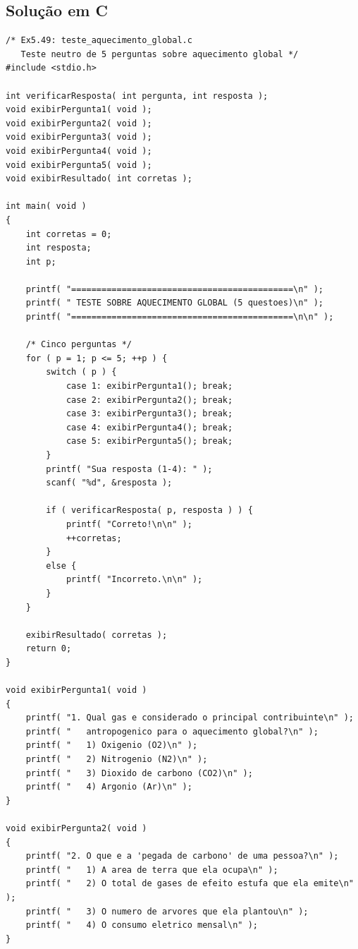 \documentclass[12pt,a4paper]{article}
\begin{document}
\subsection*{Solução em C}

\begin{respostabox}
\begin{lstlisting}
/* Ex5.49: teste_aquecimento_global.c
   Teste neutro de 5 perguntas sobre aquecimento global */
#include <stdio.h>

int verificarResposta( int pergunta, int resposta );
void exibirPergunta1( void );
void exibirPergunta2( void );
void exibirPergunta3( void );
void exibirPergunta4( void );
void exibirPergunta5( void );
void exibirResultado( int corretas );

int main( void )
{
    int corretas = 0;
    int resposta;
    int p;

    printf( "============================================\n" );
    printf( " TESTE SOBRE AQUECIMENTO GLOBAL (5 questoes)\n" );
    printf( "============================================\n\n" );

    /* Cinco perguntas */
    for ( p = 1; p <= 5; ++p ) {
        switch ( p ) {
            case 1: exibirPergunta1(); break;
            case 2: exibirPergunta2(); break;
            case 3: exibirPergunta3(); break;
            case 4: exibirPergunta4(); break;
            case 5: exibirPergunta5(); break;
        }
        printf( "Sua resposta (1-4): " );
        scanf( "%d", &resposta );

        if ( verificarResposta( p, resposta ) ) {
            printf( "Correto!\n\n" );
            ++corretas;
        }
        else {
            printf( "Incorreto.\n\n" );
        }
    }

    exibirResultado( corretas );
    return 0;
}

void exibirPergunta1( void )
{
    printf( "1. Qual gas e considerado o principal contribuinte\n" );
    printf( "   antropogenico para o aquecimento global?\n" );
    printf( "   1) Oxigenio (O2)\n" );
    printf( "   2) Nitrogenio (N2)\n" );
    printf( "   3) Dioxido de carbono (CO2)\n" );
    printf( "   4) Argonio (Ar)\n" );
}

void exibirPergunta2( void )
{
    printf( "2. O que e a 'pegada de carbono' de uma pessoa?\n" );
    printf( "   1) A area de terra que ela ocupa\n" );
    printf( "   2) O total de gases de efeito estufa que ela emite\n" );
    printf( "   3) O numero de arvores que ela plantou\n" );
    printf( "   4) O consumo eletrico mensal\n" );
}


\end{lstlisting}
\end{respostabox}
\end{document}

